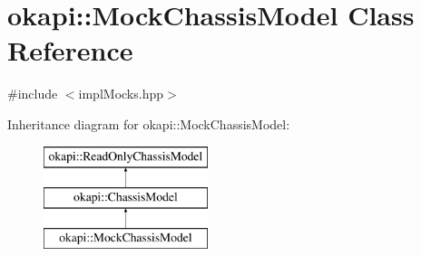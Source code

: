 \hypertarget{classokapi_1_1MockChassisModel}{}\section{okapi\+::Mock\+Chassis\+Model Class Reference}
\label{classokapi_1_1MockChassisModel}


{\ttfamily \#include $<$impl\+Mocks.\+hpp$>$}

Inheritance diagram for okapi\+::Mock\+Chassis\+Model\+:\begin{figure}[H]
\begin{center}
\leavevmode
\includegraphics[height=3.000000cm]{classokapi_1_1MockChassisModel}
\end{center}
\end{figure}
